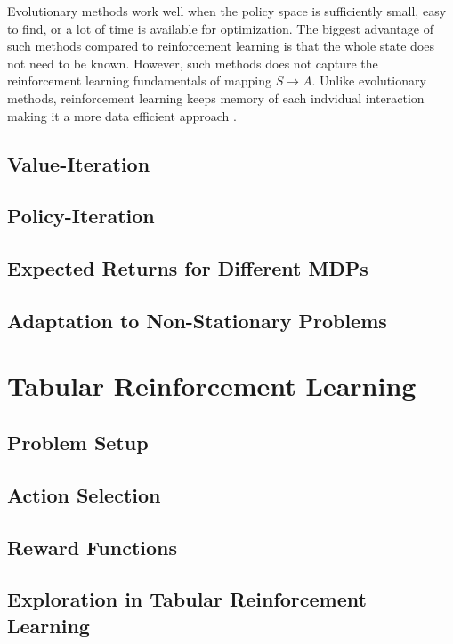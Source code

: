 Evolutionary methods work well when the policy space is sufficiently small, easy to find, or a lot of time is available for optimization.  The biggest advantage of such methods compared to reinforcement learning is that the whole state does not need to be known.  However, such methods does not capture the reinforcement learning fundamentals of mapping $S \rightarrow A$.  Unlike evolutionary methods, reinforcement learning keeps memory of each indvidual interaction making it a more data efficient approach \cite{sutton}.

\subsection{Value-Iteration}
\subsection{Policy-Iteration}
\subsection{Expected Returns for Different MDPs}
\subsection{Adaptation to Non-Stationary Problems}




\section{Tabular Reinforcement Learning}
\subsection{Problem Setup}
\subsection{Action Selection}
\subsection{Reward Functions}
\subsection{Exploration in Tabular Reinforcement Learning}


